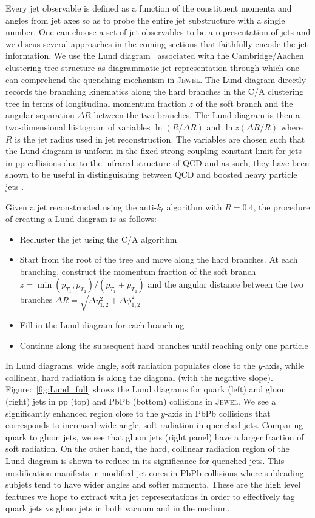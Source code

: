 \documentclass[notoc,preprintnumbers]{JHEP3}
\begin{document}
Every jet observable is defined as a function of the constituent momenta and angles from jet axes so as to probe the entire jet substructure with a single number. One can choose a set of jet observables to be a representation of jets and we discus several approaches in the coming sections that faithfully encode the jet information. We use the Lund diagram~\cite{Andersson1989} associated with the Cambridge/Aachen clustering tree structure as diagrammatic jet representation through which one can comprehend the quenching mechanism in \textsc{Jewel}. The Lund diagram directly records the branching kinematics along the hard branches in the C/A clustering tree in terms of longitudinal momentum fraction $z$ of the soft branch and the angular separation $\Delta R$ between the two branches. The Lund diagram is then a two-dimensional histogram of variables $\ln (R/\Delta R)$ and $\ln z(\Delta R/R)$ where $R$ is the jet radius used in jet reconstruction. The variables are chosen such that the Lund diagram is uniform in the fixed strong coupling constant limit for jets in pp collisions due to the infrared structure of QCD and as such, they have been shown to be useful in distinguishing between QCD and boosted heavy particle jets \cite{Salam:2016yht}.

Given a jet reconstructed using the anti-$k_{t}$ algorithm with $R = 0.4$, the procedure of creating a Lund diagram is as follows:
\begin{itemize}
	\item Recluster the jet using the C/A algorithm
	\item Start from the root of the tree and move along the hard branches. At each branching, construct the momentum fraction of the soft branch $z=\min(p_{T_1},p_{T_2})/(p_{T_1}+p_{T_2})$ and the angular distance between the two branches $\Delta R = \sqrt{\Delta \eta^2_{1, 2}+\Delta \phi^2_{1, 2}}$
	\item Fill in the Lund diagram for each branching
	\item Continue along the subsequent hard branches until reaching only one particle
\end{itemize}

In Lund diagrams. wide angle, soft radiation populates close to the $y$-axis, while collinear, hard radiation is along the diagonal (with the negative slope). Figure:~\ref{fig:Lund_full} shows the Lund diagrams for quark (left) and gluon (right) jets in pp (top) and PbPb (bottom) collisions in \textsc{Jewel}. We see a significantly enhanced region close to the $y$-axis in PbPb collisions that corresponds to increased wide angle, soft radiation in quenched jets. Comparing quark to gluon jets, we see that gluon jets (right panel) have a larger fraction of soft radiation. On the other hand, the hard, collinear radiation region of the Lund diagram is shown to reduce in its significance for quenched jets. This modification manifests in modified jet cores in PbPb collisions where subleading subjets tend to have wider angles and softer momenta. These are the high level features we hope to extract with jet representations in order to effectively tag quark jets vs gluon jets in both vacuum and in the medium.  
\end{document}
